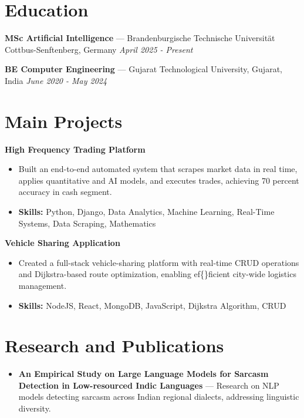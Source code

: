 \documentclass[a4paper,10pt]{article}
\begin{document}
\section*{Education}
\textbf{MSc Artificial Intelligence} — Brandenburgische Technische Universität Cottbus-Senftenberg, Germany \hfill \textit{April 2025 - Present}\par
\vspace{1.5pt}
\textbf{BE Computer Engineering} — Gujarat Technological University, Gujarat, India \hfill \textit{June 2020 - May 2024}\par

\section*{Main Projects}
\textbf{High Frequency Trading Platform}\par
\vspace{1pt}
\begin{itemize}
  \item Built an end-to-end automated system that scrapes market data in real time, applies quantitative and AI models, and executes trades, achieving 70 percent accuracy in cash segment.
  \item \textbf{Skills:} Python, Django, Data Analytics, Machine Learning, Real-Time Systems, Data Scraping, Mathematics
\end{itemize}
\vspace{3pt}
\textbf{Vehicle Sharing Application}\par
\vspace{1pt}
\begin{itemize}
  \item Created a full-stack vehicle-sharing platform with real-time CRUD operations and Dijkstra-based route optimization, enabling ef\{\}ficient city-wide logistics management.
  \item \textbf{Skills:} NodeJS, React, MongoDB, JavaScript, Dijkstra Algorithm, CRUD
\end{itemize}

\section*{Research and Publications}
\begin{itemize}
\item \textbf{An Empirical Study on Large Language Models for Sarcasm Detection in Low-resourced Indic Languages} — Research on NLP models detecting sarcasm across Indian regional dialects, addressing linguistic diversity.
\end{itemize}
\end{document}
